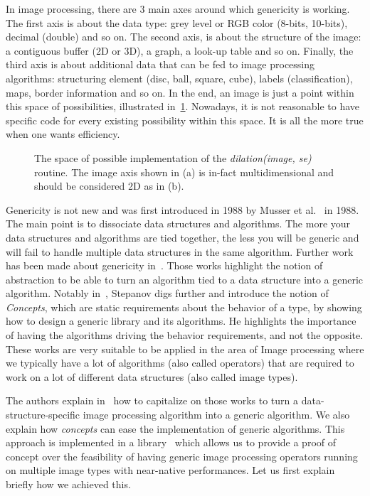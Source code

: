 In image processing, there are 3 main axes around which genericity is working. The first axis is about the data type:
grey level or RGB color (8-bits, 10-bits), decimal (double) and so on. The second axis, is about the structure of the
image: a contiguous buffer (2D or 3D), a graph, a look-up table and so on. Finally, the third axis is about additional
data that can be fed to image processing algorithms: structuring element (disc, ball, square, cube), labels
(classification), maps, border information and so on. In the end, an image is just a point within this space of
possibilities, illustrated in~\ref{fig.gen.espaceSAV}. Nowadays, it is not reasonable to have specific code for every
existing possibility within this space. It is all the more true when one wants efficiency.

\begin{figure}[tbh]
  \centering
  \subfloat[]{}
  \hfil
  \subfloat[]{}
  \caption{The space of possible implementation of the \emph{dilation(image, se)} routine. The image axis shown in (a)
    is in-fact multidimensional and should be considered 2D as in (b).}
  \label{fig.gen.espaceSAV}
\end{figure}

Genericity is not new and was first introduced in 1988 by Musser et al.~\cite{musser.1988.generic} in 1988. The main
point is to dissociate data structures and algorithms. The more your data structures and algorithms are tied together,
the less you will be generic and will fail to handle multiple data structures in the same algorithm. Further work has
been made about genericity in~\cite{musser.1994.algorithm, dehnert.1998.fundamentals}. Those works highlight the notion
of abstraction to be able to turn an algorithm tied to a data structure into a generic algorithm. Notably
in~\cite{stepanov.2009.elements}, Stepanov digs further and introduce the notion of \emph{Concepts}, which are static
requirements about the behavior of a type, by showing how to design a generic library and its algorithms. He highlights
the importance of having the algorithms driving the behavior requirements, and not the opposite. These works are very
suitable to be applied in the area of Image processing where we typically have a lot of algorithms (also called
operators) that are required to work on a lot of different data structures (also called image types).

The authors explain in~\cite{roynard.2019.rrpr} how to capitalize on those works to turn a data-structure-specific image
processing algorithm into a generic algorithm. We also explain how \emph{concepts} can ease the implementation of
generic algorithms. This approach is implemented in a library~\cite{carlinet.2018.pylena} which allows us to provide a
proof of concept over the feasibility of having generic image processing operators running on multiple image types with
near-native performances. Let us first explain briefly how we achieved this.

